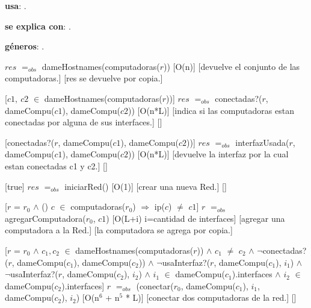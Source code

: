 \begin{Interfaz}

  \textbf{usa}: .
  
  \textbf{se explica con}: .

  \textbf{g\'eneros}: .


  {$res$ $=_{obs}$ dameHostnames(computadoras($r$))}%
  [O(n)]
  [devuelve el conjunto de las computadoras.]
  [res se devuelve por copia.]

  [$c1,\ c2$ $\in$ dameHostnames(computadoras($r$))]
  {$res$ $=_{obs}$ conectadas?($r$, dameCompu($c1$), dameCompu($c2$))}
  [O(n*L)]
  [indica si las computadoras estan conectadas por alguna de sus interfaces.]
  []

  [conectadas?($r$, dameCompu($c1$), dameCompu($c2$))]
  {$res$ $=_{obs}$ interfazUsada($r$, dameCompu($c1$), dameCompu($c2$))}
  [O(n*L)]
  [devuelve la interfaz por la cual estan conectadas c1 y c2.]
  []

  [true]
  {$res$ $=_{obs}$ iniciarRed()}
  [O(1)]
  [crear una nueva Red.]
  []
  
  [$r$ = $r_0$ $\wedge$
  () $c$ $\in$ computadoras($r_0$) $\Rightarrow$ ip($c$) $\neq$ $c1$]
  {$r$ $=_{obs}$ agregarComputadora($r_0$, $c1$)}
  [O(L+i) i=cantidad de interfaces]
  [agregar una computadora a la Red.]
  [la computadora se agrega por copia.]

  [$r$ = $r_0$ $\wedge$ $c_1, c_2$ $\in$ dameHostnames(computadoras($r$)) $\wedge$ $c_1$ $\neq$ $c_2$	$\wedge$ \newline $\neg$conectadas?($r$, dameCompu($c_1$), dameCompu($c_2$)) $\wedge$ $\neg$usaInterfaz?($r$, dameCompu($c_1$), $i_1$) $\wedge$ $\neg$usaInterfaz?($r$, dameCompu($c_2$), $i_2$) $\wedge$ $i_1$ $\in$ dameCompu($c_1$).interfaces $\wedge$ $i_2$ $\in$ dameCompu($c_2$).interfaces]
  {$r$ $=_{obs}$ (conectar($r_0$, dameCompu($c_1$), $i_1$, dameCompu($c_2$), $i_2$)}
  [O(n$^{6}$ + n$^{5}$ * L)]
  [conectar dos computadoras de la red.]
  []
   

\end{Interfaz}
